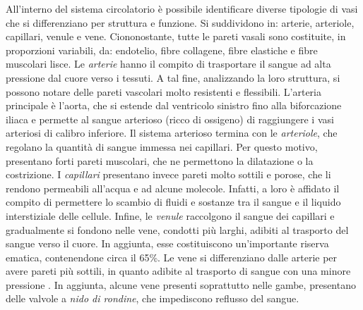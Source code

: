 All'interno del sistema circolatorio è possibile identificare diverse tipologie di vasi che si differenziano per struttura e funzione. Si suddividono in: arterie, arteriole, capillari, venule e vene. Ciononostante, tutte le pareti vasali sono costituite, in proporzioni variabili, da: endotelio, fibre collagene, fibre elastiche e fibre muscolari lisce. 
Le \textit{arterie} hanno il compito di trasportare il sangue ad alta pressione dal cuore verso i tessuti. A tal fine, analizzando la loro struttura, si possono notare delle pareti vascolari molto resistenti e flessibili. L'arteria principale è l'aorta, che si estende dal ventricolo sinistro  fino alla biforcazione iliaca e permette al sangue arterioso (ricco di ossigeno) di raggiungere i vasi arteriosi di calibro inferiore.
Il sistema arterioso termina con le \textit{arteriole}, che regolano la quantità di sangue immessa nei capillari. Per questo motivo, presentano forti pareti muscolari, che ne permettono la dilatazione o la costrizione.
I \textit{capillari} presentano invece pareti molto sottili e porose, che li rendono permeabili all'acqua e ad alcune molecole. Infatti, a loro è affidato il compito di permettere lo scambio di fluidi e sostanze tra il sangue e il liquido interstiziale delle cellule. 
Infine, le \textit{venule} raccolgono il sangue dei capillari e gradualmente si fondono nelle vene, condotti più larghi, adibiti al trasporto del sangue verso il cuore. In aggiunta, esse costituiscono un'importante riserva ematica, contenendone circa il 65\%. Le vene si differenziano dalle arterie per avere pareti più sottili, in quanto adibite al trasporto di sangue con una minore pressione \cite{Armentano2019}. In aggiunta, alcune vene presenti soprattutto nelle gambe, presentano delle valvole a \textit{nido di rondine}, che impediscono reflusso del sangue. 

